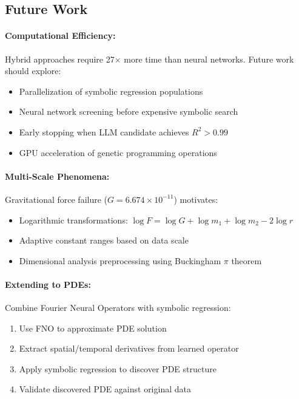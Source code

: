 \documentclass[twoside,11pt]{article}
\begin{document}

\subsection{Future Work}

\paragraph{Computational Efficiency:} Hybrid approaches require 27$\times$ more time than neural networks. Future work should explore:
\begin{itemize}
\item Parallelization of symbolic regression populations
\item Neural network screening before expensive symbolic search
\item Early stopping when LLM candidate achieves $R^2 > 0.99$
\item GPU acceleration of genetic programming operations
\end{itemize}

\paragraph{Multi-Scale Phenomena:} Gravitational force failure ($G = 6.674 \times 10^{-11}$) motivates:
\begin{itemize}
\item Logarithmic transformations: $\log F = \log G + \log m_1 + \log m_2 - 2\log r$
\item Adaptive constant ranges based on data scale
\item Dimensional analysis preprocessing using Buckingham $\pi$ theorem
\end{itemize}

\paragraph{Extending to PDEs:} Combine Fourier Neural Operators with symbolic regression:
\begin{enumerate}
\item Use FNO to approximate PDE solution
\item Extract spatial/temporal derivatives from learned operator
\item Apply symbolic regression to discover PDE structure
\item Validate discovered PDE against original data
\end{enumerate}
\end{document}
